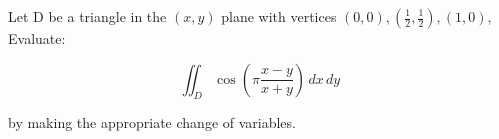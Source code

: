 Let D be a triangle in the \((x, y)\) plane with vertices \((0, 0), \left(\frac{1}{2}, \frac{1}{2}\right), (1, 0)\), Evaluate:

\[
\iint_D \cos\left(\pi \frac{x-y}{x+y}\right) \, dx \, dy
\]

by making the appropriate change of variables.
